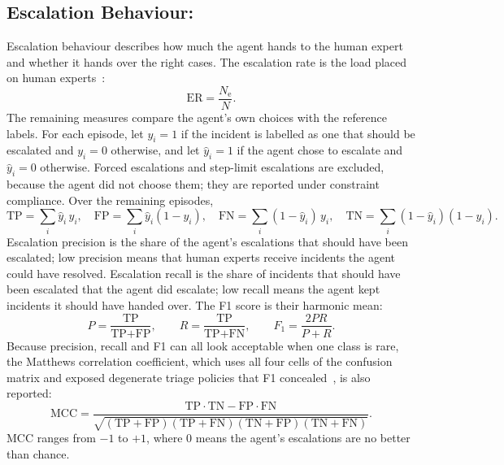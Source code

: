 \subsection{Escalation Behaviour:}

Escalation behaviour describes how much the agent hands to the human expert and whether it hands over the right cases. The escalation rate is the load placed on human experts~\cite{turan2026}:
\begin{equation}
\text{ER} = \frac{N_{\text{e}}}{N}.
\end{equation}
The remaining measures compare the agent's own choices with the reference labels. For each episode, let $y_i = 1$ if the incident is labelled as one that should be escalated and $y_i = 0$ otherwise, and let $\hat{y}_i = 1$ if the agent chose to escalate and $\hat{y}_i = 0$ otherwise. Forced escalations and step-limit escalations are excluded, because the agent did not choose them; they are reported under constraint compliance. Over the remaining episodes,
\begin{equation}
\text{TP} = \sum_i \hat{y}_i\, y_i, \quad
\text{FP} = \sum_i \hat{y}_i (1-y_i), \quad
\text{FN} = \sum_i (1-\hat{y}_i)\, y_i, \quad
\text{TN} = \sum_i (1-\hat{y}_i)(1-y_i).
\end{equation}
Escalation precision is the share of the agent's escalations that should have been escalated; low precision means that human experts receive incidents the agent could have resolved. Escalation recall is the share of incidents that should have been escalated that the agent did escalate; low recall means the agent kept incidents it should have handed over. The F1 score is their harmonic mean:
\begin{equation}
P = \frac{\text{TP}}{\text{TP}+\text{FP}}, \qquad
R = \frac{\text{TP}}{\text{TP}+\text{FN}}, \qquad
F_1 = \frac{2PR}{P+R}.
\end{equation}
Because precision, recall and F1 can all look acceptable when one class is rare, the Matthews correlation coefficient, which uses all four cells of the confusion matrix and exposed degenerate triage policies that F1 concealed~\cite{okafor2026}, is also reported:
\begin{equation}
\text{MCC} = \frac{\text{TP}\cdot\text{TN} - \text{FP}\cdot\text{FN}}
{\sqrt{(\text{TP}+\text{FP})(\text{TP}+\text{FN})(\text{TN}+\text{FP})(\text{TN}+\text{FN})}}.
\end{equation}
MCC ranges from $-1$ to $+1$, where $0$ means the agent's escalations are no better than chance.

